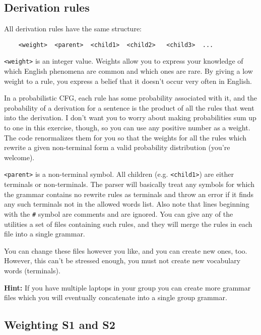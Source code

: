 \documentclass[12pt]{article}
\begin{document}
\subsection*{Derivation rules}
All derivation rules have the same structure:

\begin{verbatim}
    <weight>  <parent>  <child1>  <child2>   <child3>  ...
\end{verbatim}

\verb+<weight>+ is an integer value. Weights allow you to express your knowledge of which English phenomena are common and which ones are rare. By giving a low weight to a rule, you express a belief that it doesn't occur very often in English.

In a probabilistic CFG, each rule has some probability associated with it, and the probability of a derivation for a sentence is the product of all the rules that went into the derivation. I don't want you to worry about making probabilities sum up to one in this exercise, though, so you can use any positive number as a weight. The code renormalizes them for you so that the weights for all the rules which rewrite a given non-terminal form a valid probability distribution (you're welcome).

\verb+<parent>+ is a non-terminal symbol. All children (e.g. \verb+<child1>+) are either terminals or non-terminals. The parser will basically treat any symbols for which the grammar contains no rewrite rules as terminals and throw an error if it finds any such terminals not in the allowed words list. Also note that lines beginning with the \verb+#+ symbol are comments and are ignored. You can give any of the utilities a set of files containing such rules, and they will merge the rules in each file into a single
grammar.

You can change these files however you like, and you can create new ones, too. However, this can't be stressed enough, you must not create new vocabulary words (terminals).

\begin{shaded}
\textbf{Hint:} If you have multiple laptops in your group you can create more grammar files which you will eventually concatenate into a single group grammar.
\end{shaded}

\subsection*{Weighting S1 and S2}
\end{document}
